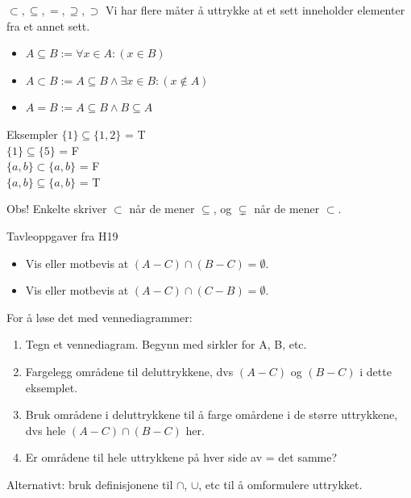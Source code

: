 \begin{frame}{$\subset, \subseteq, =, \supseteq, \supset$}
    Vi har flere måter å uttrykke at et sett inneholder elementer fra et annet sett.
    \begin{itemize}
        \item $A \subseteq B := \forall x \in A : (x \in B)$
        \item $A \subset B := A \subseteq B \land \exists x \in B : (x \notin A)$
        \item $A = B := A \subseteq B \land B \subseteq A$
    \end{itemize}
    \pause
    \begin{block}{Eksempler}
        $\{1\} \subseteq \{1, 2\}$ = T\\
        $\{1\} \subseteq \{5\}$ = F\\
        $\{a, b\} \subset \{a, b\}$ = F\\
        $\{a, b\} \subseteq \{a, b\}$ = T
    \end{block}
    \pause
    \centering
    Obs! Enkelte skriver $\subset$ når de mener $\subseteq$, og $\subsetneq$ når de mener $\subset$.
\end{frame}

\begin{frame}{Tavleoppgaver fra H19}
    \begin{itemize}
        \item Vis eller motbevis at $(A - C) \cap (B - C) = \emptyset.$
        \item Vis eller motbevis at $(A - C) \cap (C - B) = \emptyset.$
    \end{itemize}
    
    For å løse det med vennediagrammer:
    \begin{enumerate}
        \item Tegn et vennediagram. Begynn med sirkler for A, B, etc.
        \item Fargelegg områdene til deluttrykkene, dvs $(A - C)$ og $(B - C)$ i dette eksemplet.
        \item Bruk områdene i deluttrykkene til å farge omårdene i de større uttrykkene, dvs hele $(A - C) \cap (B - C)$ her.
        \item Er områdene til hele uttrykkene på hver side av = det samme?
    \end{enumerate}
    \pause
    Alternativt: bruk definisjonene til $\cap$, $\cup$, etc til å omformulere uttrykket.
\end{frame}

